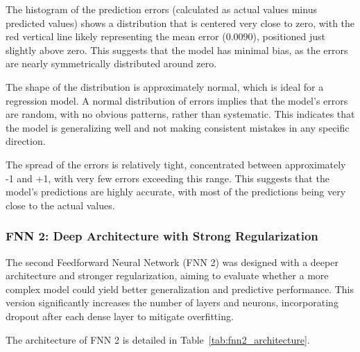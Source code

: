 The histogram of the prediction errors (calculated as actual values minus predicted values) shows a distribution that is centered very close to zero, with the red vertical line likely representing the mean error (0.0090), positioned just slightly above zero. This suggests that the model has minimal bias, as the errors are nearly symmetrically distributed around zero.

The shape of the distribution is approximately normal, which is ideal for a regression model. A normal distribution of errors implies that the model's errors are random, with no obvious patterns, rather than systematic. This indicates that the model is generalizing well and not making consistent mistakes in any specific direction.

The spread of the errors is relatively tight, concentrated between approximately -1 and +1, with very few errors exceeding this range. This suggests that the model's predictions are highly accurate, with most of the predictions being very close to the actual values.

\subsubsection{FNN 2: Deep Architecture with Strong Regularization}

The second Feedforward Neural Network (FNN 2) was designed with a deeper architecture and stronger regularization, aiming to evaluate whether a more complex model could yield better generalization and predictive performance. This version significantly increases the number of layers and neurons, incorporating dropout after each dense layer to mitigate overfitting.

The architecture of FNN 2 is detailed in Table~\ref{tab:fnn2_architecture}.

